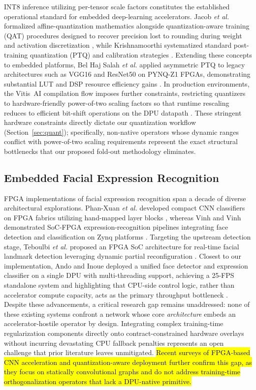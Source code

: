 \documentclass[algorithms,article,submit,moreauthors]{Definitions/mdpi}
\newcommand{\rev}[1]{\hl{#1}}        %
\begin{document}
INT8 inference utilizing per-tensor scale factors constitutes the established operational standard for embedded deep-learning accelerators. Jacob \textit{et al.} formalized affine-quantization mathematics alongside quantization-aware training (QAT) procedures designed to recover precision lost to rounding during weight and activation discretization \citep{bib9}, while Krishnamoorthi systematized standard post-training quantization (PTQ) and calibration strategies \citep{bib10}. Extending these concepts to embedded platforms, Bel Haj Salah \textit{et al.} applied asymmetric PTQ to legacy architectures such as VGG16 and ResNet50 on PYNQ-Z1 FPGAs, demonstrating substantial LUT and DSP resource efficiency gains \citep{bib11}. In production environments, the Vitis~AI compilation flow imposes further constraints, restricting quantizers to hardware-friendly power-of-two scaling factors so that runtime rescaling reduces to efficient bit-shift operations on the DPU datapath \citep{bib1}. These stringent hardware constraints directly dictate our quantization workflow (Section~\ref{sec:quant}); specifically, non-native operators whose dynamic ranges conflict with power-of-two scaling requirements represent the exact structural bottlenecks that our proposed fold-out methodology eliminates.

\subsection{Embedded Facial Expression Recognition}

FPGA implementations of facial expression recognition span a decade of diverse architectural explorations. Phan-Xuan \textit{et al.} developed compact CNN classifiers on FPGA fabrics utilizing hand-mapped layer blocks \citep{bib12}, whereas Vinh and Vinh demonstrated SoC-FPGA expression-recognition pipelines integrating face detection and classification on Zynq platforms \citep{bib13}. Targeting the upstream detection stage, Teboulbi \textit{et al.} proposed an FPGA SoC architecture for real-time facial landmark detection leveraging dynamic partial reconfiguration \citep{bib14}. Closest to our implementation, Ando and Inoue deployed a unified face detector and expression classifier on a single DPU with multi-threading support, achieving a 25-FPS standalone system and highlighting that CPU-side control logic, rather than accelerator compute capacity, acts as the primary throughput bottleneck \citep{bib15}. Despite these advancements, a critical research gap remains unaddressed: none of these existing systems confront a network whose core \emph{architecture} embeds an accelerator-hostile operator by design. Integrating complex training-time regularization components directly onto contract-constrained hardware overlays without incurring devastating CPU fallback penalties represents an open challenge that prior literature leaves unmitigated. \rev{Recent surveys of FPGA-based CNN acceleration and quantization-aware deployment further confirm this gap, as they focus on statically convolutional graphs and do not address training-time orthogonalization operators that lack a DPU-native primitive.}
\end{document}
